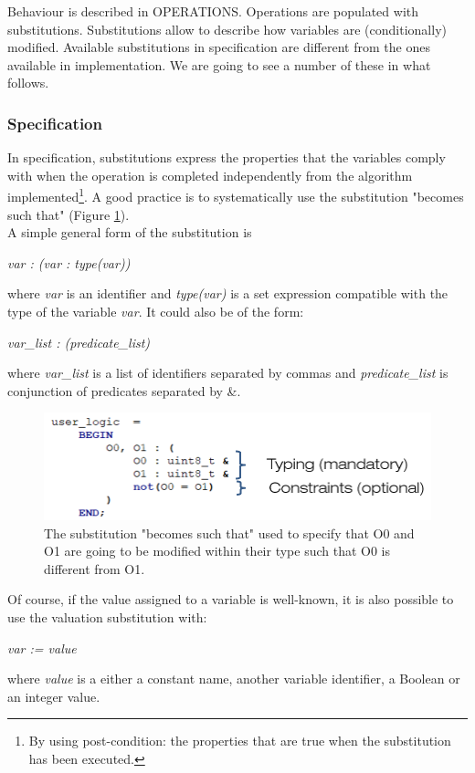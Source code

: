 Behaviour is described in OPERATIONS. Operations are populated with substitutions. Substitutions allow to describe how variables are (conditionally) modified. Available substitutions in specification are different from the ones available in implementation. We are going to see a number of these in what follows.

\subsubsection{Specification}

In specification, substitutions express the properties that the variables comply with  when the operation is completed independently from  the algorithm implemented\footnote{By using post-condition: the properties that are true when the substitution has been executed.}. A good practice is to systematically use the substitution "becomes such that" (Figure \ref{programming:subst-becomes-such-that}).\\ A simple general form of the substitution is 
\begin{center}
\textit{var : (var : type(var))}    
\end{center} where \textit{var} is an identifier and \textit{type(var)} is a set expression compatible with the type of the variable \textit{var}. It could  also be of the form:
\begin{center}
\textit{var\_list : (predicate\_list)}    
\end{center} where \textit{var\_list} is a list of identifiers separated by commas and \textit{predicate\_list} is conjunction of predicates separated by \&.
\begin{figure}[ht]
\centering\includegraphics[scale=0.30]{Pictures/chapterProgramming/subst-becomes-such-that.png}
\caption{The substitution "becomes such that" used to specify that O0 and O1 are going to be modified within their type such that O0 is different from O1. }
\label{programming:subst-becomes-such-that}
\end{figure}  
Of course, if the value assigned to a variable is well-known, it is also possible to use the valuation substitution with:
\begin{center}
\textit{var := value}    
\end{center} where \textit{value} is a either a constant name, another variable identifier, a Boolean or an integer value.\\

